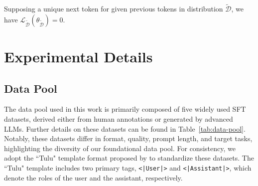 Supposing a unique next token for given previous tokens in distribution $\mathcal{\widetilde D}$, we have $ {\mathcal L}_{\mathcal {\widetilde D}}(\theta_{\mathcal {\widetilde D}}) = 0$.



\section{Experimental Details}\label{sec:apx_experiment_details}

\subsection{Data Pool}\label{sec:apx_data_pool}
The data pool used in this work is primarily composed of five widely used SFT datasets, derived either from human annotations or generated by advanced LLMs. Further details on these datasets can be found in Table~\ref{tab:data-pool}. Notably, these datasets differ in format, quality, prompt length, and target tasks, highlighting the diversity of our foundational data pool.
For consistency, we adopt the ``Tulu" template format proposed by \citet{wang2023far} to standardize these datasets. The ``Tulu" template includes two primary tags,  \texttt{<|User|>} and \texttt{<|Assistant|>}, which denote the roles of the user and the assistant, respectively.

\begin{table}[h]
\centering
\caption{Statistical summary of our 50k data pool. The average prompt length and the average response length are measured based on \texttt{LLaMA-3.2-3B}.}
\vspace{0.1in}
\label{tab:data-pool}
\end{table}




